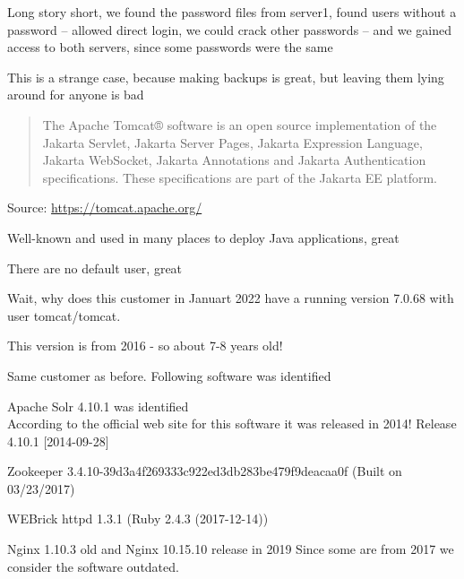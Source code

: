 \documentclass[Screen16to9,17pt]{foils}
\begin{document}
Long story short, we found the password files from server1, found users without a password -- allowed direct login, we could crack other passwords -- and we gained access to both servers, since some passwords were the same

This is a strange case, because making backups is great, but leaving them lying around for anyone is bad




\begin{quote}
The Apache Tomcat® software is an open source implementation of the Jakarta Servlet, Jakarta Server Pages, Jakarta Expression Language, Jakarta WebSocket, Jakarta Annotations and Jakarta Authentication specifications. These specifications are part of the Jakarta EE platform.
\end{quote}
Source: \url{https://tomcat.apache.org/}

\begin{list2}
\item Well-known and used in many places to deploy Java applications, great
\item There are no default user, great
\end{list2}

Wait, why does this customer in Januart 2022 have a running version 7.0.68 with user tomcat/tomcat.

This version is from 2016 - so about 7-8 years old!


Same customer as before. Following software was identified
\begin{list2}
\item Apache Solr 4.10.1 was identified\\
According to the official web site for this software it was released in 2014! Release 4.10.1 [2014-09-28]
\item Zookeeper 3.4.10-39d3a4f269333c922ed3db283be479f9deacaa0f (Built on 03/23/2017)
\item WEBrick httpd 1.3.1 (Ruby 2.4.3 (2017-12-14))
\item Nginx 1.10.3 old and Nginx 10.15.10 release in 2019
Since some are from 2017 we consider the software outdated.
\end{list2}


\end{document}
